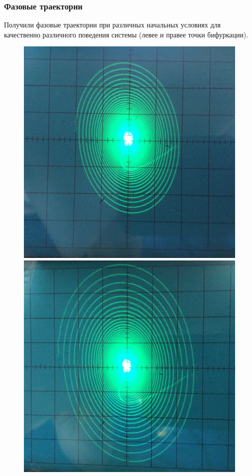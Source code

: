 \subsubsection{Фазовые траектории}
Получили фазовые траектории при различных начальных условиях для качественно различного поведения системы (левее и правее точки бифуркации).
\begin{figure}[h]
	\centering
	\begin{minipage}{0.32\linewidth}
	\includegraphics[width=\linewidth]{photo/task1b(lefts).jpg}
	\end{minipage}
	\begin{minipage}{0.32\linewidth}
	\includegraphics[width=\linewidth]{photo/task1b(leftm).jpg}

\end{minipage}
\end{figure}
